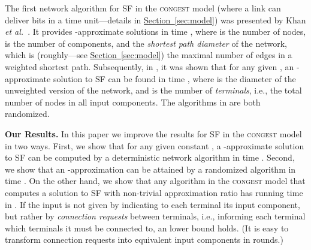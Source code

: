 \documentclass[letterpaper,11pt]{article}
\newcommand{\namedref}[2]{\hyperref[#2]{#1~\ref*{#2}}}
\newcommand{\sectionref}[1]{\namedref{Section}{#1}}
\newcommand{\Congest}{\textsc{congest}\xspace}
\renewcommand{\paragraph}[1]{\smallskip\par\noindent\textbf{#1}}
\begin{document}
The first network algorithm for
SF in the \Congest model (where a link can deliver  bits in a
time unit---details in \sectionref{sec:model}) was presented by
Khan \textit{et al.}\ \cite{KKMPT-12}. 
It provides -approximate solutions in time , where  is
the number of nodes,  is the number of components, and  the \emph{shortest
path diameter} of the network, which is
(roughly---see \sectionref{sec:model})  the maximal number of edges in a weighted shortest path. Subsequently, in \cite{LenzenP13}, it was shown that for any given
, an -approximate solution to SF can
be found in time , where  is the diameter
of the unweighted version of the network, and  is the number of
\emph{terminals}, i.e., the total number of nodes in all input components.  The
algorithms in \cite{KKMPT-12,LenzenP13} are both randomized.

\paragraph{Our Results.}
In this paper we improve the results for SF in the \Congest model in two ways.
First, we show that for any given constant , a
-approximate solution to SF can be computed by a deterministic
network algorithm in time .
Second, we show that an -approximation can be attained by a
randomized algorithm in time .
On the other hand, we show that any algorithm in the \Congest model that
computes a solution to SF with non-trivial approximation ratio has running time
in . If the input is not given by
indicating to each terminal its input component, but rather by
\emph{connection
requests} between terminals, i.e., informing each terminal which
terminals  it must be
connected to, an   lower bound
holds.  (It is easy to transform connection requests into equivalent
input components in  rounds.)
\end{document}
